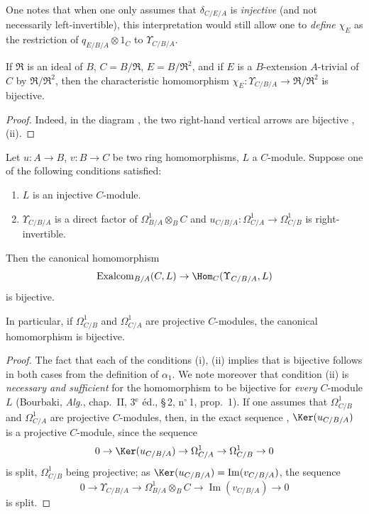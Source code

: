 One notes that when one only assumes that $\delta_{C/E/A}$ is \emph{injective} (and not necessarily left-invertible), this interpretation would still allow one to \emph{define} $\chi_E$ as the restriction of $q_{E/B/A}\otimes 1_C$ to $\Upsilon_{C/B/A}$.

\begin{corollary}[20.6.10]
\label{0.20.6.10}
If $\mathfrak{R}$ is an ideal of $B$, $C=B/\mathfrak{R}$, $E=B/\mathfrak{R}^2$, and if $E$ is a $B$-extension $A$-trivial  of $C$ by $\mathfrak{R}/\mathfrak{R}^2$, then the characteristic homomorphism $\chi_E:\Upsilon_{C/B/A}\to\mathfrak{R}/\mathfrak{R}^2$ is bijective.
\end{corollary}

\begin{proof}
Indeed, in the diagram , the two right-hand vertical arrows are bijective , (ii).
\end{proof}

\begin{theorem}[20.6.11]
\label{0.20.6.11}
Let $u:A\to B$, $v:B\to C$ be two ring homomorphisms, $L$ a $C$-module.
Suppose one of the following conditions satisfied:
\begin{enumerate}
  \item[\rm(i)] $L$ is an injective $C$-module.
  \item[\rm(ii)] $\Upsilon_{C/B/A}$ is a direct factor of $\Omega^1_{B/A}\otimes_B C$ and $u_{C/B/A}:\Omega^1_{C/A}\to\Omega^1_{C/B}$ is right-invertible.
\end{enumerate}
Then the canonical homomorphism 
\[
  \operatorname{Exalcom}_{B/A}(C,L)\to\Hom_C(\Upsilon_{C/B/A},L)
\]
is bijective.

In particular, if $\Omega^1_{C/B}$ and $\Omega^1_{C/A}$ are projective $C$-modules, the canonical homomorphism  is bijective.
\end{theorem}

\begin{proof}
The fact that each of the conditions (i), (ii) implies that  is bijective follows in both cases from the definition of $\alpha_1$.
We note moreover that condition (ii) is \emph{necessary and sufficient} for the homomorphism  to be bijective for \emph{every} $C$-module $L$ (Bourbaki, \emph{Alg.}, chap.~II, 3$^\text{e}$ \'{e}d., \S\,2, n$^\circ$\,1, prop.~1).
If one assumes that $\Omega^1_{C/B}$ and $\Omega^1_{C/A}$ are projective $C$-modules, then, in the exact sequence , $\Ker(u_{C/B/A})$ is a projective $C$-module, since the sequence
\[
  0\to\Ker(u_{C/B/A})\to\Omega^1_{C/A}\to\Omega^1_{C/B}\to 0
\]
is split, $\Omega^1_{C/B}$ being projective; as $\Ker(u_{C/B/A})=\operatorname{Im}(v_{C/B/A})$, the sequence
\[
  0\to\Upsilon_{C/B/A}\to\Omega^1_{B/A}\otimes_B C\to\operatorname{Im}(v_{C/B/A})\to 0
\]
is split.
\end{proof}


